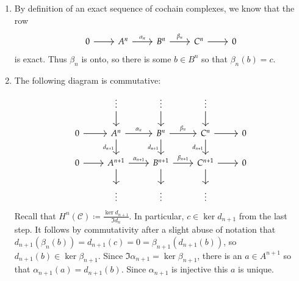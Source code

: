 \documentclass[12pt]{article}
\theoremstyle{definitionstyle}
\begin{document}
    \begin{enumerate}[label=(\alph*)]
        \item By definition of an exact sequence of cochain complexes, we know that the row
        \[\begin{tikzcd}
            0 & {A^n} & {B^n} & {C^n} & 0
            \arrow[from=1-1, to=1-2]
            \arrow["{\alpha_n}", from=1-2, to=1-3]
            \arrow["{\beta_n}", from=1-3, to=1-4]
            \arrow[from=1-4, to=1-5]
        \end{tikzcd}\]
        is exact. Thus $\beta_n$ is onto, so there is some $b \in B^n$ so that $\beta_n(b) = c$.
        \item The following diagram is commutative:
        \[\begin{tikzcd}
            & \vdots & \vdots & \vdots \\
            0 & {A^n} & {B^n} & {C^n} & 0 \\
            0 & {A^{n+1}} & {B^{n+1}} & {C^{n+1}} & 0 \\
            & \vdots & \vdots & \vdots
            \arrow[from=1-2, to=2-2]
            \arrow[from=1-3, to=2-3]
            \arrow[from=1-4, to=2-4]
            \arrow[from=2-1, to=2-2]
            \arrow["{\alpha_n}", from=2-2, to=2-3]
            \arrow["{d_{n+1}}"', from=2-2, to=3-2]
            \arrow["{\beta_n}", from=2-3, to=2-4]
            \arrow["{d_{n+1}}"', from=2-3, to=3-3]
            \arrow[from=2-4, to=2-5]
            \arrow["{d_{n+1}}"', from=2-4, to=3-4]
            \arrow[from=3-1, to=3-2]
            \arrow["{\alpha_{n+1}}", from=3-2, to=3-3]
            \arrow[from=3-2, to=4-2]
            \arrow["{\beta_{n+1}}", from=3-3, to=3-4]
            \arrow[from=3-3, to=4-3]
            \arrow[from=3-4, to=3-5]
            \arrow[from=3-4, to=4-4]
        \end{tikzcd}\]
        Recall that $H^n(\mathscr C) \coloneqq \frac{\ker d_{n+1}}{\Im d_n}$. In particular, $c \in \ker d_{n+1}$ from the last step. It follows by commutativity after a slight abuse of notation that $d_{n+1}(\beta_n(b)) = d_{n+1}(c) = 0 = \beta_{n+1}(d_{n+1}(b))$, so $d_{n+1}(b) \in \ker \beta_{n+1}$. Since $\Im \alpha_{n+1} = \ker \beta_{n+1}$, there is an $a \in A^{n+1}$ so that $\alpha_{n+1}(a) = d_{n+1}(b)$. Since $\alpha_{n+1}$ is injective this $a$ is unique.


\end{enumerate}
\end{document}
